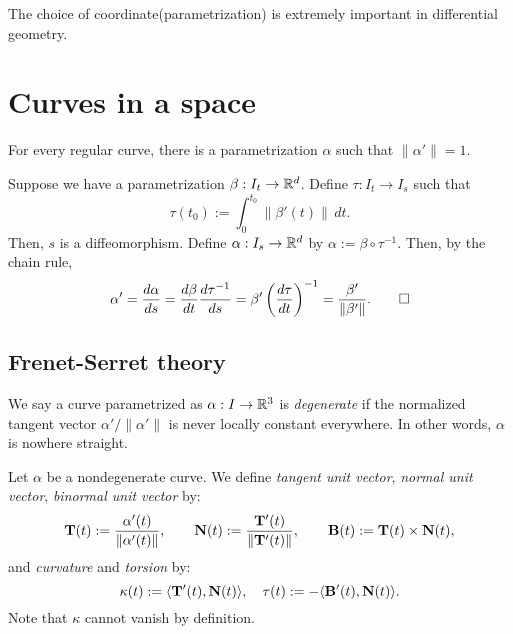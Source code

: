\documentclass{../exp}
\def\a{\alpha}
\begin{document}
The choice of coordinate(parametrization) is extremely important in differential geometry.




\section{Curves in a space}
\begin{thm}
For every regular curve, there is a parametrization $\a$ such that $\|\a'\|=1$.
\end{thm}
\begin{pf}
Suppose we have a parametrization $\beta:I_t\to\R^d$.
Define $\tau:I_t\to I_s$ such that
\[\tau(t_0):=\int_0^{t_0}\|\beta'(t)\|\,dt.\]
Then, $s$ is a diffeomorphism.
Define $\a:I_s\to\R^d$ by $\a:=\beta\circ\tau^{-1}$.
Then, by the chain rule,
\[\a'=\dd{\a}{s}=\dd{\beta}{t}\dd{\tau^{-1}}{s}=\beta'\left(\dd{\tau}{t}\right)^{-1}=\frac{\beta'}{\|\beta'\|}.\qedhere\]
\end{pf}



\subsection{Frenet-Serret theory}

\begin{defn}
We say a curve parametrized as $\a:I\to\R^3$ is \emph{degenerate} if the normalized tangent vector $\a'/\|\a'\|$ is never locally constant everywhere.
In other words, $\a$ is nowhere straight.
\end{defn}

\begin{defn}
Let $\a$ be a nondegenerate curve.
We define \emph{tangent unit vector}, \emph{normal unit vector}, \emph{binormal unit vector} by:
\[\bT(t):=\frac{\a'(t)}{\norm{\a'(t)}},\qquad\bN(t):=\frac{\bT'(t)}{\|\bT'(t)\|},\qquad\bB(t):=\bT(t)\times\bN(t),\]
and \emph{curvature} and \emph{torsion} by:
\[\kappa(t):=\langle\mathbf{T}'(t),\mathbf{N}(t)\rangle,\quad\tau(t):=-\langle\mathbf{B}'(t),\mathbf{N}(t)\rangle.\]
Note that $\kappa$ cannot vanish by definition.
\end{defn}
\end{document}
